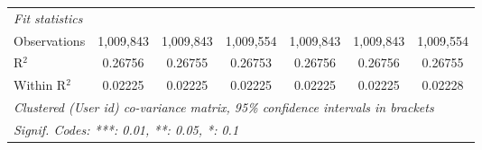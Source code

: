 \begin{table}[htbp]
\begin{threeparttable}[b]
\begin{tabular}{lcccccc}
         \midrule
         \emph{Fit statistics}\\
         Observations                   & 1,009,843            & 1,009,843            & 1,009,554            & 1,009,843            & 1,009,843            & 1,009,554\\  
         R$^2$                          & 0.26756              & 0.26755              & 0.26753              & 0.26756              & 0.26756              & 0.26755\\  
         Within R$^2$                   & 0.02225              & 0.02225              & 0.02225              & 0.02225              & 0.02225              & 0.02228\\  
         \midrule \midrule
         \multicolumn{7}{l}{\emph{Clustered (User id) co-variance matrix, 95\% confidence intervals in brackets}}\\
         \multicolumn{7}{l}{\emph{Signif. Codes: ***: 0.01, **: 0.05, *: 0.1}}\\
      \end{tabular}
   \end{threeparttable}
\end{table}


